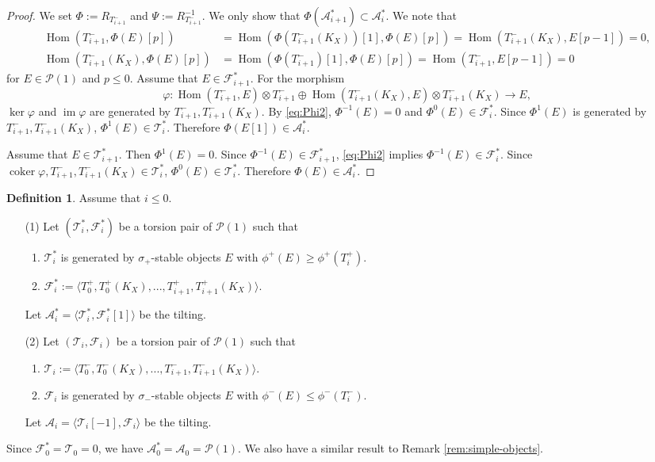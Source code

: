 \documentclass[leqno,11pt]{amsart}
\def\Hom{\mathop{\mathrm{Hom}}\nolimits}
\def\im{\mathop{\mathrm{im}}\nolimits}
\def\coker{\mathop{\mathrm{coker}}\nolimits}
\theoremstyle{definition}
\newtheorem{Def}[Thm]{Definition}
\def\AA{\ensuremath{\mathcal A}}
\def\FF{\ensuremath{\mathcal F}}
\def\PP{\ensuremath{\mathcal P}}
\def\TT{\ensuremath{\mathcal T}}
\begin{document}
\begin{proof}
We set $\Phi:=R_{T_{i+1}^-}$ and $\Psi:=R_{T_{i+1}^-}^{-1}$.
We only show that 
$\Phi(\AA_{i+1}^*) \subset \AA_i^*$.
We note that 
\begin{equation}\label{eq:Phi2}
\begin{split}
\Hom(T_{i+1}^-,\Phi(E)[p])& =\Hom(\Phi(T_{i+1}^-(K_X))[1],\Phi(E)[p])
=\Hom(T_{i+1}^-(K_X),E[p-1])=0,\\
\Hom(T_{i+1}^-(K_X),\Phi(E)[p])&=\Hom(\Phi(T_{i+1}^-)[1],\Phi(E)[p])
=\Hom(T_{i+1}^-,E[p-1])=0
\end{split}
\end{equation}
for $E \in \PP(1)$ and $p \leq 0$.
Assume that $E \in \FF_{i+1}^*$.
For the morphism
\begin{equation}
\varphi:\Hom(T_{i+1}^-,E) \otimes T_{i+1}^- \oplus  
\Hom(T_{i+1}^-(K_X),E) \otimes T_{i+1}^- (K_X)
\to E,
\end{equation}
$\ker\varphi$ and $\im \varphi$ are generated by
$T_{i+1}^-,T_{i+1}^- (K_X)$.
By \eqref{eq:Phi2}, $\Phi^{-1}(E)=0$ and $\Phi^0(E) \in \FF_i^*$.
Since $\Phi^1(E)$ is generated by
$T_{i+1}^-,T_{i+1}^- (K_X)$,
$\Phi^1(E) \in \TT_i^*$.
Therefore $\Phi(E[1]) \in \AA_i^*$.


Assume that $E \in \TT_{i+1}^*$.
Then $\Phi^1(E)=0$.
Since $\Phi^{-1}(E) \in \FF_{i+1}^*$, \eqref{eq:Phi2} implies
$\Phi^{-1}(E) \in \FF_i^*$.
Since $\coker \varphi, T_{i+1}^-, T_{i+1}^- (K_X) \in \TT_i^*$,
$\Phi^0(E) \in \TT_i^*$.
Therefore $\Phi(E) \in \AA_i^*$.
\end{proof}



\begin{Def}
Assume that $i \leq 0$.
\begin{enumerate}
\item[(1)]
Let $(\TT_i^*,\FF_i^*)$ be a torsion pair of $\PP(1)$ such that
\begin{enumerate}
\item
$\TT_i^*$ is generated by $\sigma_+$-stable objects $E$ with 
$\phi^+(E) \geq \phi^+(T_i^+)$.
\item
$\FF_i^*:=\langle T_0^+,T_0^+ (K_X),...,T_{i+1}^+, T_{i+1}^+ (K_X) \rangle$.
\end{enumerate}
Let $\AA_i^*=\langle \TT_i^*,\FF_i^*[1] \rangle$ be the tilting.
\item[(2)]
Let $(\TT_i,\FF_i)$ be a torsion pair of $\PP(1)$ such that
\begin{enumerate}
\item
$\TT_i:=\langle T_0^-,T_0^- (K_X),...,T_{i+1}^-, T_{i+1}^- (K_X) \rangle$.
\item
$\FF_i$ is generated by $\sigma_-$-stable objects $E$ with 
$\phi^-(E) \leq \phi^-(T_i^-)$.
\end{enumerate}
Let $\AA_i=\langle \TT_i[-1],\FF_i\rangle$ be the tilting.
\end{enumerate}
\end{Def}
Since $\FF_0^*=\TT_0=0$,
we have $\AA_0^*=\AA_0=\PP(1)$.
We also have a similar result to Remark \ref{rem:simple-objects}.
\end{document}
